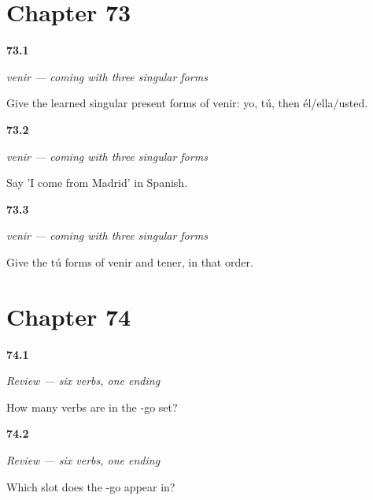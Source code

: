\section*{Chapter 73}

\noindent\begin{minipage}[t]{\linewidth}
\raggedright
\hypertarget{review-ES-C13-venir-singular-forms}{\textbf{73.1}} \emph{venir — coming with three singular forms}\par
\small Give the learned singular present forms of venir: yo, tú, then él/ella/usted.
\end{minipage}\par\medskip

\noindent\begin{minipage}[t]{\linewidth}
\raggedright
\hypertarget{review-ES-C13-venir-come-from-madrid}{\textbf{73.2}} \emph{venir — coming with three singular forms}\par
\small Say 'I come from Madrid' in Spanish.
\end{minipage}\par\medskip

\noindent\begin{minipage}[t]{\linewidth}
\raggedright
\hypertarget{review-ES-C13-venir-tener-contrast}{\textbf{73.3}} \emph{venir — coming with three singular forms}\par
\small Give the tú forms of venir and tener, in that order.
\end{minipage}\par\medskip

\section*{Chapter 74}

\noindent\begin{minipage}[t]{\linewidth}
\raggedright
\hypertarget{review-ES-C13-repaso-yo-go-count}{\textbf{74.1}} \emph{Review — six verbs, one ending}\par
\small How many verbs are in the -go set?
\end{minipage}\par\medskip

\noindent\begin{minipage}[t]{\linewidth}
\raggedright
\hypertarget{review-ES-C13-repaso-yo-go-slot}{\textbf{74.2}} \emph{Review — six verbs, one ending}\par
\small Which slot does the -go appear in?
\end{minipage}\par\medskip

